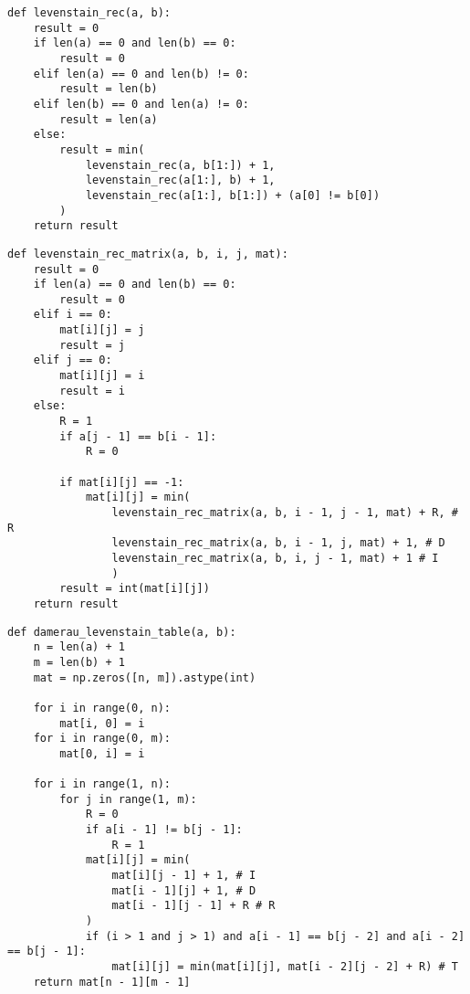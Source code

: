 \begin{lstlisting}[label=some-code-2,caption=Реализация рекурсивного алгоритма поиска расстояния Левенштейна без заполнения матрицы.]
def levenstain_rec(a, b):
    result = 0
    if len(a) == 0 and len(b) == 0:
        result = 0
    elif len(a) == 0 and len(b) != 0:
        result = len(b)
    elif len(b) == 0 and len(a) != 0:
        result = len(a)
    else:
        result = min(
            levenstain_rec(a, b[1:]) + 1,
            levenstain_rec(a[1:], b) + 1,
            levenstain_rec(a[1:], b[1:]) + (a[0] != b[0])
        )
    return result

\end{lstlisting}

\begin{lstlisting}[label=some-code-3,caption=Реализация  рекурсивного алгоритма поиска расстояния Левенштейна с заполнением и дополнительными проверками матрицы.]
def levenstain_rec_matrix(a, b, i, j, mat):
    result = 0
    if len(a) == 0 and len(b) == 0:
        result = 0
    elif i == 0:
        mat[i][j] = j
        result = j
    elif j == 0:
        mat[i][j] = i
        result = i
    else:
        R = 1
        if a[j - 1] == b[i - 1]:
            R = 0

        if mat[i][j] == -1:
            mat[i][j] = min(
                levenstain_rec_matrix(a, b, i - 1, j - 1, mat) + R, # R
                levenstain_rec_matrix(a, b, i - 1, j, mat) + 1, # D
                levenstain_rec_matrix(a, b, i, j - 1, mat) + 1 # I
                )
        result = int(mat[i][j])
    return result
\end{lstlisting}

\begin{lstlisting}[label=some-code-4,caption=Реализация нерекурсивного алгоритма поиска расстояния Дамерау-Левенштейна табличным способом.]
def damerau_levenstain_table(a, b):
    n = len(a) + 1
    m = len(b) + 1
    mat = np.zeros([n, m]).astype(int)
    
    for i in range(0, n):
        mat[i, 0] = i
    for i in range(0, m):
        mat[0, i] = i

    for i in range(1, n):
        for j in range(1, m):
            R = 0
            if a[i - 1] != b[j - 1]:
                R = 1
            mat[i][j] = min(
                mat[i][j - 1] + 1, # I
                mat[i - 1][j] + 1, # D
                mat[i - 1][j - 1] + R # R
            )
            if (i > 1 and j > 1) and a[i - 1] == b[j - 2] and a[i - 2] == b[j - 1]:
                mat[i][j] = min(mat[i][j], mat[i - 2][j - 2] + R) # T
    return mat[n - 1][m - 1]
\end{lstlisting}

